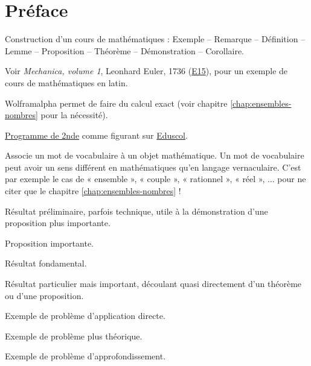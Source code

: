 
\chapter*{Préface}

Construction d'un cours de mathématiques : Exemple -- Remarque -- Définition -- Lemme -- Proposition -- Théorème -- Démonstration -- Corollaire.

Voir \emph{Mechanica, volume 1}, Leonhard Euler, 1736 (\href{https://scholarlycommons.pacific.edu/euler-works/15/}{E15}), pour un exemple de cours de mathématiques en latin.

Wolframalpha permet de faire du calcul exact (voir chapitre \ref{chap:ensembles-nombres} pour la nécessité).

\href{https://eduscol.education.fr/document/24553/download}{Programme de 2nde} comme figurant sur 
\href{https://eduscol.education.fr/1723/programmes-et-ressources-en-mathematiques-voie-gt}{Eduscol}.

\begin{definition*}
Associe un mot de vocabulaire à un objet mathématique.
Un mot de vocabulaire peut avoir un sens différent en mathématiques qu'en langage vernaculaire.
C'est par exemple le cas de « ensemble », « couple », « rationnel », « réel », ... pour ne citer que le chapitre \ref{chap:ensembles-nombres} !
\end{definition*}

\begin{lemme*}
	Résultat préliminaire, parfois technique, utile à la démonstration d'une proposition plus importante.
\end{lemme*}

\begin{proposition*}
	Proposition importante.
\end{proposition*}

\begin{theorem*}
	Résultat fondamental.
\end{theorem*}

\begin{corollaire*}
	Résultat particulier mais important, découlant quasi directement d'un théorème ou d'une proposition.
\end{corollaire*}

\begin{Exercise}[counter=preface]
	Exemple de problème d'application directe.
\end{Exercise}
\begin{Exercise}[difficulty=1, counter=preface]
	Exemple de problème plus théorique.
\end{Exercise}
\begin{Exercise}[difficulty=2, counter=preface]
	Exemple de problème d'approfondissement.
\end{Exercise}

